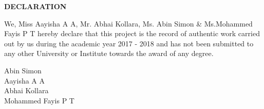 \centerline{\large{\bfseries{DECLARATION}}}

\hspace{1in}

\normalsize

We, Miss Aayisha A A, Mr. Abhai Kollara, Ms. Abin Simon & Ms.Mohammed Fayis P T  hereby declare that this project is the record of authentic work carried out by us during the academic year 2017 - 2018 and has not been submitted to any other University or Institute towards the award of any degree.

\begin{flushright} Abin Simon\\
Aayisha A A\\
Abhai Kollara\\
Mohammed Fayis P T
\end{flushright}
